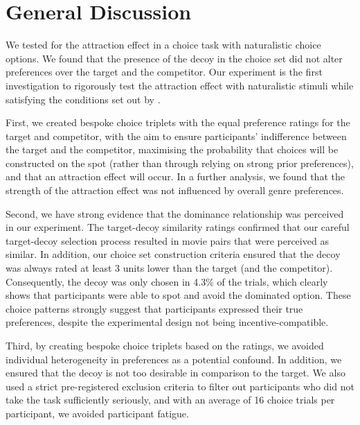 \documentclass[12pt, a4paper]{article}
\begin{document}
\section*{General Discussion}

We tested for the attraction effect in a choice task with naturalistic choice options. We found that the presence of the decoy in the choice set did not alter preferences over the target and the competitor. Our experiment is the first investigation to rigorously test the attraction effect with naturalistic stimuli while satisfying the conditions set out by .



First, we created bespoke choice triplets with the equal preference ratings for the target and competitor, with the aim to ensure participants' indifference between the target and the competitor, maximising the probability that choices will be constructed on the spot (rather than through relying on strong prior preferences), and that an attraction effect will occur. 
In a further analysis, we found that the strength of the attraction effect was not influenced by overall genre preferences. 

Second, we have strong evidence that the dominance relationship was perceived in our experiment. The target-decoy similarity ratings confirmed that our careful target-decoy selection process resulted in movie pairs that were perceived as similar. In addition, our choice set construction criteria ensured that the decoy was always rated at least 3 units lower than the target (and the competitor). Consequently, the decoy was only chosen in 4.3\% of the trials, which clearly shows that participants were able to spot and avoid the dominated option. These choice patterns strongly suggest that participants expressed their true preferences, despite the experimental design not being incentive-compatible.

Third, by creating bespoke choice triplets based on the ratings, we avoided individual heterogeneity in preferences as a potential confound. In addition, we ensured that the decoy is not too desirable in comparison to the target. We also used a strict pre-registered exclusion criteria to filter out participants who did not take the task sufficiently seriously, and with an average of 16 choice trials per participant, we avoided participant fatigue.
\end{document}

